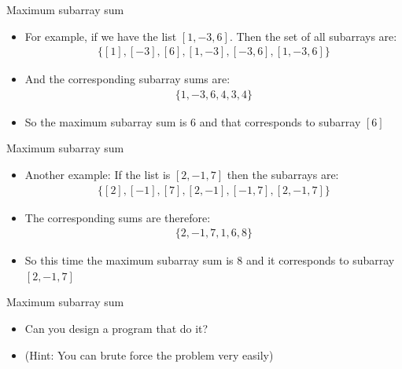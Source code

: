 \documentclass[10pt,xcolor={table,dvipsnames},t]{beamer}
\begin{document}
\begin{frame}{Maximum subarray sum}
  \begin{itemize}
    \item For example, if we have the list $\left[1,-3,6\right]$. Then the set of all subarrays are:
    \begin{align*}
      \{[1],[-3],[6],[1,-3],[-3,6],[1,-3,6]\}
    \end{align*}
    \item And the corresponding subarray sums are:
    \begin{align*}
      \{1,-3,6,4,3,4\}
    \end{align*}
    \item So the maximum subarray sum is $6$ and that corresponds to subarray $[6]$
  \end{itemize}
\end{frame}

\begin{frame}{Maximum subarray sum}
  \begin{itemize}
    \item Another example: If the list is $[2,-1,7]$ then the subarrays are:
    \begin{align*}
      \{[2],[-1],[7],[2,-1],[-1,7],[2,-1,7]\}
    \end{align*}
    \item The corresponding sums are therefore:
    \begin{align*}
      \{2,-1,7,1,6,8\}
    \end{align*}
    \item So this time the maximum subarray sum is $8$ and it corresponds to subarray $[2,-1,7]$
  \end{itemize}
\end{frame}

\begin{frame}{Maximum subarray sum}
  \begin{itemize}
    \item Can you design a program that do it? \item (Hint: You can brute force the problem very easily)
  \end{itemize}
\end{frame}
\end{document}
